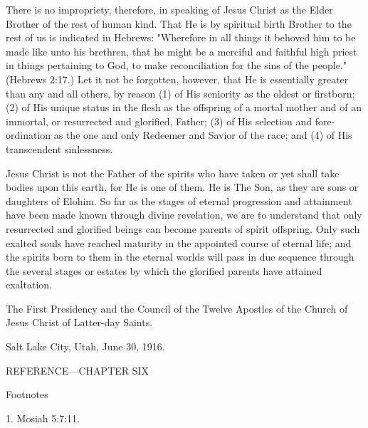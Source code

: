 There is no impropriety, therefore, in speaking of Jesus Christ as the Elder Brother of the rest
of human kind. That He is by spiritual birth Brother to the rest of us is indicated in Hebrews:
"Wherefore in all things it behoved him to be made like unto his brethren, that he might be a
merciful and faithful high priest in things pertaining to God, to make reconciliation for the
sins of the people." (Hebrews 2:17.) Let it not be forgotten, however, that He is essentially
greater than any and all others, by reason (1) of His seniority as the oldest or firstborn; (2) of
His unique status in the flesh as the offspring of a mortal mother and of an immortal, or
resurrected and glorified, Father; (3) of His selection and fore-ordination as the one and only
Redeemer and Savior of the race; and (4) of His transcendent sinlessness.

Jesus Christ is not the Father of the spirits who have taken or yet shall take bodies upon this
earth, for He is one of them. He is The Son, as they are sons or daughters of Elohim. So far
as the stages of eternal progression and attainment have been made known through divine
revelation, we are to understand that only resurrected and glorified beings can become
parents of spirit offspring. Only such exalted souls have reached maturity in the appointed
course of eternal life; and the spirits born to them in the eternal worlds will pass in due
sequence through the several stages or estates by which the glorified parents have attained
exaltation.

The First Presidency and the Council of the Twelve Apostles of the Church of Jesus Christ of
Latter-day Saints.

Salt Lake City, Utah, June 30, 1916.

\newpage
REFERENCE—CHAPTER SIX

Footnotes

1. Mosiah 5:7:11.
